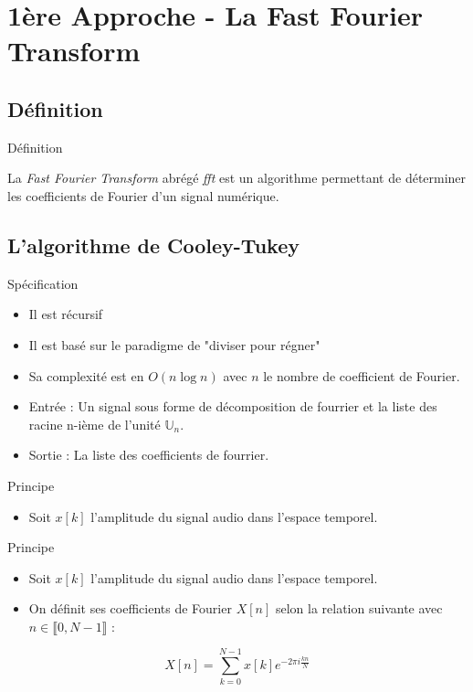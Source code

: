 \documentclass[10pt]{beamer}
\begin{document}
\section{1ère Approche - La Fast Fourier Transform}
\subsection{Définition}
\begin{frame}{Définition}
	\begin{df}{}{}
		La \textit{Fast Fourier Transform} abrégé \textit{fft} est un algorithme permettant de déterminer les coefficients de Fourier d'un signal numérique.
	\end{df}
\end{frame}
\subsection{L'algorithme de Cooley-Tukey}
\begin{frame}{Spécification}
	\begin{itemize}
		\item Il est récursif
		\item Il est basé sur le paradigme de "diviser pour régner"
		\item Sa complexité est en $O(n\log{n})$ avec $n$ le nombre de coefficient de Fourier.
		\item Entrée : Un signal sous forme de décomposition de fourrier et la liste des racine n-ième de l'unité $\mathbb{U}_n$.
		\item Sortie :  La liste des coefficients de fourrier.
	\end{itemize}
\end{frame}

\begin{frame}[t]{Principe}
\begin{itemize}
	\item Soit $x[k]$ l'amplitude du signal audio dans l'espace temporel.
\end{itemize}
\end{frame}
\begin{frame}[t]{Principe}
\begin{itemize}
	\item Soit $x[k]$ l'amplitude du signal audio dans l'espace temporel.
	\item On définit ses coefficients de Fourier $X[n]$ selon la relation suivante avec $n\in \llbracket 0, N-1\rrbracket$ :
\end{itemize}
$$X[n]=\sum^{N-1}_{k=0}x[k]e^{-2\pi i\frac{k n}{N}}$$
\end{frame}
\end{document}
